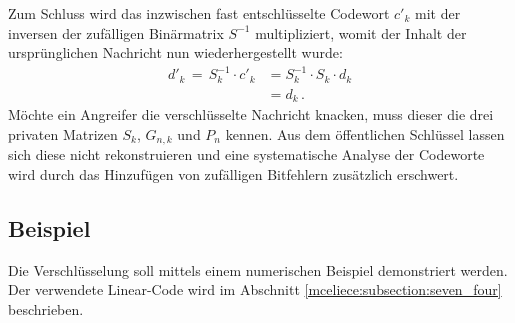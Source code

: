 Zum Schluss wird das inzwischen fast entschlüsselte Codewort $c'_k$ mit der inversen der zufälligen Binärmatrix $S^{-1}$ multipliziert,
womit der Inhalt der ursprünglichen Nachricht nun wiederhergestellt wurde:
\begin{align*}
    d'_{k}\,=\,S_{k}^{-1} \cdot c'_k&=S_{k}^{-1} \cdot S_{k}\cdot d_k\\
                                    &=d_k\,.
\end{align*}
Möchte ein Angreifer die verschlüsselte Nachricht knacken, muss dieser die drei privaten Matrizen $S_k$, $G_{n,k}$ und $P_n$ kennen.
Aus dem öffentlichen Schlüssel lassen sich diese nicht rekonstruieren
und eine systematische Analyse der Codeworte wird durch das Hinzufügen von zufälligen Bitfehlern zusätzlich erschwert.

\subsection{Beispiel}
Die Verschlüsselung soll mittels einem numerischen Beispiel demonstriert werden. 
Der verwendete Linear-Code wird im Abschnitt \ref{mceliece:subsection:seven_four} beschrieben.

